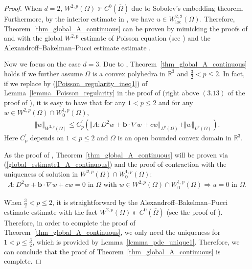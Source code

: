 \documentclass[12pt]{amsart}
\theoremstyle{definition}
\theoremstyle{remark}
\begin{document}
\begin{proof}
When $d=2$, $W^{2,p}(\Omega) \Subset C^{0}(\overline{\Omega})$ due to 
Sobolev's embedding theorem. Furthermore,  by the interior estimate in 
\cite[Lemma~$9.16$]{GT01}, 
we have $u \in W_{\text{loc}}^{2,2}(\Omega)$. Therefore, 
Theorem~\ref{thm_global_A_continuous} can be proven by mimicking the proofs 
of \cite[Theorem~$1.1$]{QT2023} and \cite[Corollary~$1.2$]{QT2023} with the global 
$W^{2,p}$ estimate of Poisson equation (see \cite[Proposition~$2.1$]{ChibaSaito2019}) 
and the Alexandroff–Bakelman–Pucci estimate estimate \cite[Theorem~$9.1$]{GT01}.

Now we focus on the case $d=3$. Due to \cite[Corollary~$1.2$]{QT2023}, Theorem~\ref{thm_global_A_continuous} 
holds if we further assume $\Omega$ is a convex polyhedra in $\mathbb{R}^{3}$ and $\frac{3}{2} < p \leq 2$. 
In fact, if we replace \cite[Corollary~$3.12$]{Dauge1992} by
(\ref{Poisson_regularity_ineq1}) of Lemma~\ref{lemma_Poisson_regularity} 
in the proof of \cite[Theorem~$1.1$]{QT2023} (right above $(3.13)$ of 
the proof of \cite[Proposition~$3.2$]{QT2023}), it is easy to have that  
for any $1 < p \leq 2$ and for any $w \in W^{2,p}(\Omega) 
\cap W_{0}^{1,p}(\Omega)$,
\begin{align}
\label{global_estimate1_A_continuous}
\Vert w\Vert_{W^{2,p}(\Omega)} \leq C_{p}^{\prime} \left( \Vert A:D^{2}w  
+ \boldsymbol{b}\cdot\nabla w + cw\Vert_{L^{p}(\Omega)} 
+ \Vert w \Vert_{L^{p}(\Omega)} \right).
\end{align}  
Here $C_{p}^{\prime}$ depends on $1 < p \leq 2$ and $\Omega$ is an open bounded convex domain in $\mathbb{R}^{3}$.

As the proof of \cite[Corollary~$1.2$]{QT2023}, Theorem~\ref{thm_global_A_continuous} will be proven 
via (\ref{global_estimate1_A_continuous}) and 
the proof of contraction with the uniqueness of solution in $W^{2,p}(\Omega) \cap W_{0}^{1,p}(\Omega)$: 
\begin{align*}
A:D^{2}w + \boldsymbol{b}\cdot \nabla w + cw = 0 \text{ in } \Omega 
\text{ with } w \in W^{2,p}(\Omega) \cap W_{0}^{1,p}(\Omega)   
\Longrightarrow u = 0 \text{ in } \Omega.
\end{align*}

When $\frac{3}{2} < p \leq 2$, it is straightforward by the Alexandroff–Bakelman–Pucci estimate estimate with the fact 
$W^{2,p}(\Omega) \Subset C^{0}(\overline{\Omega})$ (see the proof of \cite[Corollary~$1.2$]{QT2023}). 
Therefore, in order to complete the proof of Theorem~\ref{thm_global_A_continuous}, we only need 
the uniqueness for $1<p \leq \frac{3}{2}$, which is provided by Lemma~\ref{lemma_pde_unique1}.
Therefore, we can conclude that the proof of Theorem~\ref{thm_global_A_continuous} is complete.
\end{proof}
\end{document}
